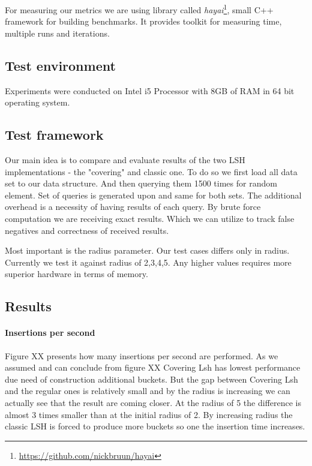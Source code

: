 For measuring our metrics we are using library called
\textit{hayai}\footnote{\url{https://github.com/nickbruun/hayai}}, small C++
framework for building benchmarks. It provides toolkit for measuring time, multiple runs and iterations.

\subsection{Test environment}

Experiments were conducted on Intel i5 Processor with 8GB of RAM in 64 bit
operating system. 

\subsection{Test framework}

Our main idea is to compare and evaluate results of the two
LSH implementations - the "covering" and classic one. To do so we first load all
data set to our data structure. And then querying them 1500 times for random
element. Set of queries is generated upon and same for both sets. The
additional overhead is a necessity of having results of each query. By brute
force computation we are receiving exact results. Which we can utilize to track
false negatives and correctness of received results.

Most important is the radius parameter. Our test cases differs only in radius.
Currently we test it against radius of 2,3,4,5. Any higher values requires more superior hardware in terms of memory.

\subsection{Results}

\paragraph{Insertions per second}

Figure XX presents how many insertions per second are performed. 
As we assumed and can conclude from figure XX  Covering Lsh has lowest performance due need of construction
additional buckets. But the gap between Covering Lsh and the regular ones is
relatively small and by the radius is increasing we can actually see that the
result are coming closer. At the radius of 5 the difference is almost 3 times
smaller than at the initial radius of 2. By increasing radius the classic LSH
is forced to produce more buckets so one the insertion time increases. 

